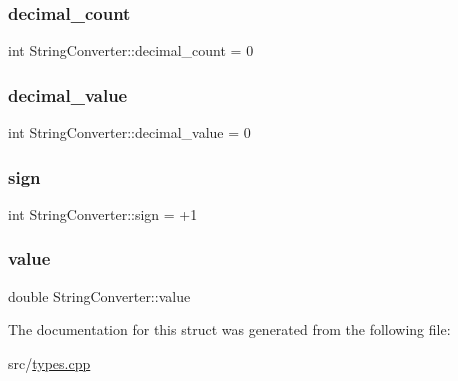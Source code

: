 \subsubsection{\texorpdfstring{decimal\+\_\+count}{decimal\_count}}
{\footnotesize\ttfamily int String\+Converter\+::decimal\+\_\+count = 0}

\mbox{\label{struct_string_converter_a21c545dac997e7a4ac950ae05dc03f36}} 
\subsubsection{\texorpdfstring{decimal\+\_\+value}{decimal\_value}}
{\footnotesize\ttfamily int String\+Converter\+::decimal\+\_\+value = 0}

\mbox{\label{struct_string_converter_ad3171cef3031bb13d3a2d36d1136036d}} 
\subsubsection{\texorpdfstring{sign}{sign}}
{\footnotesize\ttfamily int String\+Converter\+::sign = +1}

\mbox{\label{struct_string_converter_ad0ff89f7e2ea10804590fc2ac7e9b3b2}} 
\subsubsection{\texorpdfstring{value}{value}}
{\footnotesize\ttfamily double String\+Converter\+::value}



The documentation for this struct was generated from the following file\+:\begin{DoxyCompactItemize}
\item 
src/\hyperlink{types_8cpp}{types.\+cpp}\end{DoxyCompactItemize}
